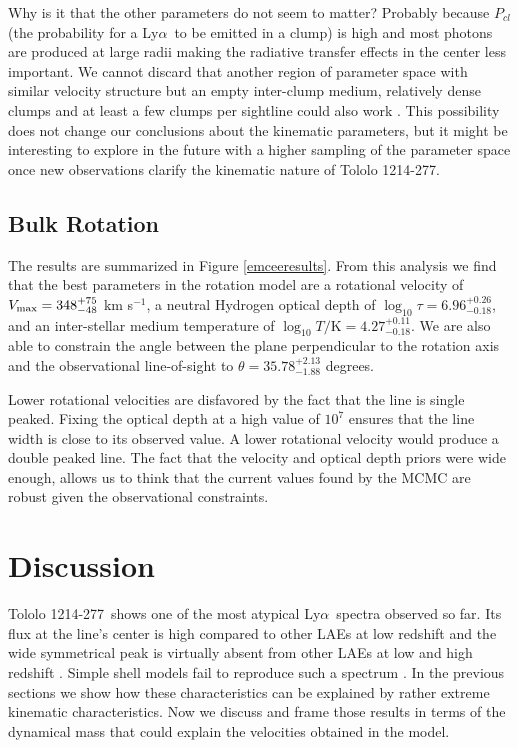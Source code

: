 \documentclass[a4,useAMS,usenatbib,usegraphicx]{mn2e}
\newcommand{\tol}{Tololo 1214-277}
\newcommand{\lya}{Ly$\alpha$}
\newcommand{\kms}{km s$^{-1}$}
\begin{document}
Why is it that the other parameters do not seem to matter? Probably
because $P_{cl}$ (the probability for a \lya\ to be emitted in a
clump) is high and most photons are produced at
large radii making the radiative transfer effects in the center less
important.  
We cannot discard that another region of parameter space with similar
velocity structure but an empty inter-clump medium, relatively dense
clumps and at least a few clumps per sightline 
could also work \citep{Hansen06}.
This possibility does not change our conclusions about the
kinematic parameters, but it might be interesting to explore in the
future with a higher sampling of the parameter space once new
observations clarify the kinematic nature of \tol.  

\subsection{Bulk Rotation}


The results are summarized in  Figure \ref{emceeresults}. 
From this analysis we find that the best parameters in the rotation
model are a rotational velocity of  $V_{\rm max}=348^{+75}_{-48}$
\kms, a neutral Hydrogen optical depth of
$\log_{10}\tau=6.96^{+0.26}_{-0.18}$,  and an inter-stellar medium
temperature of $\log_{10} T/\mathrm {K} = 4.27^{+0.11}_{-0.18}$.   
We are also able to constrain the angle between the plane
perpendicular to the rotation axis and the observational line-of-sight
to $\theta = 35.78^{+2.13}_{-1.88}$ degrees.

Lower rotational velocities are disfavored by the fact that the line
is single peaked.
Fixing the optical depth at a high value of $10^7$ ensures that the line width
is close to its observed value.
A lower rotational velocity would produce a double peaked line.
The fact that the velocity and optical depth priors were wide enough,
allows us to think that the current values found by the MCMC are
robust given the observational constraints.




\section{Discussion}

\tol\ shows one of the most atypical \lya\ spectra observed so far.
Its flux at the line's center is high compared to other LAEs at low
redshift and the wide symmetrical peak is virtually absent from other
LAEs at low and high redshift \citep{LARS,Erb14,Trainor16}. Simple
shell models fail to reproduce such a spectrum
\cite{2015A&A...578A...7V}.  
In the previous sections we show how these characteristics can be
explained by rather extreme kinematic characteristics.
Now we discuss and frame those results in terms of the dynamical mass
that could explain the velocities obtained in the model.
\end{document}
